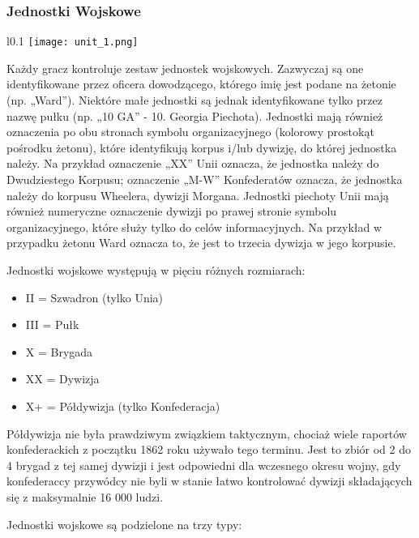 \subsubsection*{Jednostki Wojskowe}
\begin{wrapfigure}{l}{0.1\textwidth}
    \texttt{[image: unit\_1.png]}
\end{wrapfigure}
Każdy gracz kontroluje zestaw jednostek wojskowych. Zazwyczaj są one identyfikowane przez oficera dowodzącego, którego imię jest podane na żetonie (np. „Ward”). Niektóre małe jednostki są jednak identyfikowane tylko przez nazwę pułku (np. „10 GA” - 10. Georgia Piechota). Jednostki mają również oznaczenia po obu stronach symbolu organizacyjnego (kolorowy prostokąt pośrodku żetonu), które identyfikują korpus i/lub dywizję, do której jednostka należy. Na przykład oznaczenie „XX” Unii oznacza, że jednostka należy do Dwudziestego Korpusu; oznaczenie „M-W” Konfederatów oznacza, że jednostka należy do korpusu Wheelera, dywizji Morgana. Jednostki piechoty Unii mają również numeryczne oznaczenie dywizji po prawej stronie symbolu organizacyjnego, które służy tylko do celów informacyjnych. Na przykład w przypadku żetonu Ward oznacza to, że jest to trzecia dywizja w jego korpusie.\par
Jednostki wojskowe występują w pięciu różnych rozmiarach:
\begin{itemize}
    \item[] II = Szwadron (tylko Unia)
    \item[] III = Pułk
    \item[] X = Brygada
    \item[] XX = Dywizja
    \item[] X+ = Półdywizja (tylko Konfederacja)
\end{itemize}
Półdywizja nie była prawdziwym związkiem taktycznym, chociaż wiele raportów konfederackich z początku 1862 roku używało tego terminu. Jest to zbiór od 2 do 4 brygad z tej samej dywizji i jest odpowiedni dla wczesnego okresu wojny, gdy konfederaccy przywódcy nie byli w stanie łatwo kontrolować dywizji składających się z maksymalnie 16 000 ludzi.\par
Jednostki wojskowe są podzielone na trzy typy:
